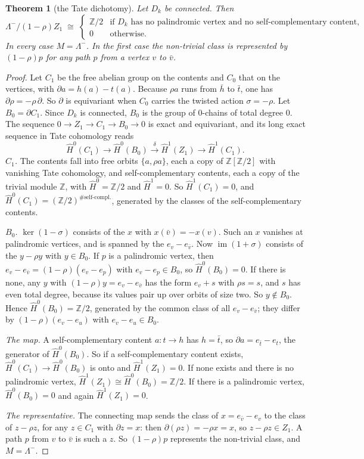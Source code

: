 \documentclass[11pt]{article}
\theoremstyle{plain}
\newtheorem{theorem}{Theorem}
\theoremstyle{definition}
\theoremstyle{remark}
\newcommand{\Z}{\mathbb{Z}}
\newcommand{\Lm}{\Lambda^{-}}
\newcommand{\Hh}{\widehat{H}}
\begin{document}
\begin{theorem}[the Tate dichotomy]\label{thm:tate}
Let $D_k$ be connected. Then
\[
\Lm/(1-\rho)Z_1\;\cong\;\begin{cases}\Z/2&\text{if $D_k$ has no palindromic vertex and no
self-complementary content,}\\ 0&\text{otherwise.}\end{cases}
\]
In every case $M=\Lm$. In the first case the non-trivial class is represented by $(1-\rho)p$ for any
path $p$ from a vertex $v$ to $\bar v$.
\end{theorem}

\begin{proof}
Let $C_1$ be the free abelian group on the contents and $C_0$ that on the vertices, with
$\partial a=h(a)-t(a)$. Because $\rho a$ runs from $\bar h$ to $\bar t$, one has
$\partial\rho=-\rho\,\partial$. So $\partial$ is equivariant when $C_0$ carries the twisted action
$\sigma=-\rho$. Let $B_0=\partial C_1$. Since $D_k$ is connected, $B_0$ is the group of $0$-chains of
total degree $0$. The sequence $0\to Z_1\to C_1\to B_0\to0$ is exact and equivariant, and its long exact
sequence in Tate cohomology reads
\[
\Hh^0(C_1)\longrightarrow\Hh^0(B_0)\xrightarrow{\ \delta\ }\Hh^1(Z_1)\longrightarrow\Hh^1(C_1).
\]
\emph{$C_1$.} The contents fall into free orbits $\{a,\rho a\}$, each a copy of $\Z[\Z/2]$ with vanishing
Tate cohomology, and self-complementary contents, each a copy of the trivial module $\Z$, with
$\Hh^0=\Z/2$ and $\Hh^1=0$. So $\Hh^1(C_1)=0$, and $\Hh^0(C_1)=(\Z/2)^{\#\text{self-compl.}}$, generated by
the classes of the self-complementary contents.

\emph{$B_0$.} $\ker(1-\sigma)$ consists of the $x$ with $x(\bar v)=-x(v)$. Such an $x$ vanishes at palindromic
vertices, and is spanned by the $e_v-e_{\bar v}$. Now $\operatorname{im}(1+\sigma)$ consists of the
$y-\rho y$ with $y\in B_0$. If $p$ is a palindromic vertex, then $e_v-e_{\bar v}=(1-\rho)(e_v-e_p)$ with
$e_v-e_p\in B_0$, so $\Hh^0(B_0)=0$. If there is none, any $y$ with $(1-\rho)y=e_v-e_{\bar v}$ has the form
$e_v+s$ with $\rho s=s$, and $s$ has even total degree, because its values pair up over orbits of size
two. So $y\notin B_0$. Hence $\Hh^0(B_0)=\Z/2$, generated by the common class of all $e_v-e_{\bar v}$;
they differ by $(1-\rho)(e_v-e_u)$ with $e_v-e_u\in B_0$.

\emph{The map.} A self-complementary content $a\colon t\to h$ has $h=\bar t$, so
$\partial a=e_{\bar t}-e_t$, the generator of $\Hh^0(B_0)$. So if a self-complementary content exists,
$\Hh^0(C_1)\to\Hh^0(B_0)$ is onto and $\Hh^1(Z_1)=0$. If none exists and there is no palindromic vertex,
$\Hh^1(Z_1)\cong\Hh^0(B_0)=\Z/2$. If there is a palindromic vertex, $\Hh^0(B_0)=0$ and again
$\Hh^1(Z_1)=0$.

\emph{The representative.} The connecting map sends the class of $x=e_{\bar v}-e_v$ to the class of
$z-\rho z$, for any $z\in C_1$ with $\partial z=x$: then $\partial(\rho z)=-\rho x=x$, so $z-\rho z\in Z_1$. A
path $p$ from $v$ to $\bar v$ is such a $z$. So $(1-\rho)p$ represents the non-trivial class, and $M=\Lm$.
\end{proof}
\end{document}
